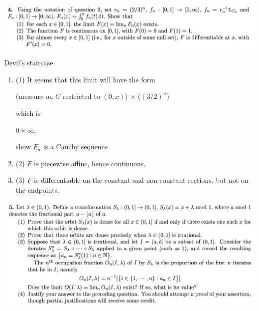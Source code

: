 \begin{mdframed}
  \includegraphics[width=400pt]{img/analysis--berkeley-202a-8ce8.png}
\end{mdframed}

Devil's staircase
\begin{enumerate}[label=(4.\arabic*)]

\item (1) It seems that this limit will have the form

  (measure on $C$ restricted to $(0, x)$) $\times$ ($(3/2)^n$)

  which is

  $0 \times \infty$.

show $F_n$ is a Cauchy sequence
\item (2) $F$ is piecewise affine, hence continuous.

\item (3) $F$ is differentiable on the constant and non-constant sections, but not on the endpoints.

\end{enumerate}



\begin{mdframed}
  \includegraphics[width=400pt]{img/analysis--berkeley-202a-ccfa.png}
\end{mdframed}

